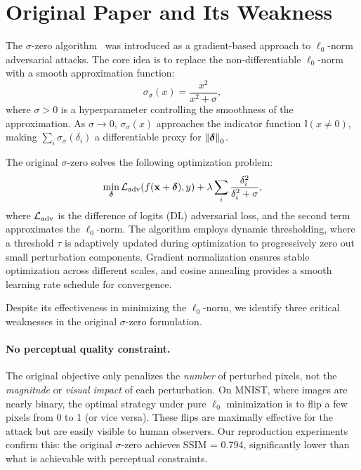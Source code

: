 \section{Original Paper and Its Weakness}
\label{sec:background}

The $\sigma$-zero algorithm~\cite{cina2025sigma} was introduced as a gradient-based approach to $\ell_0$-norm adversarial attacks. The core idea is to replace the non-differentiable $\ell_0$-norm with a smooth approximation function:
\begin{equation}
    \sigma_\sigma(x) = \frac{x^2}{x^2 + \sigma},
\end{equation}
where $\sigma > 0$ is a hyperparameter controlling the smoothness of the approximation. As $\sigma \to 0$, $\sigma_\sigma(x)$ approaches the indicator function $\mathbb{I}(x \neq 0)$, making $\sum_i \sigma_\sigma(\delta_i)$ a differentiable proxy for $\left\|\boldsymbol{\delta}\right\|_0$.

The original $\sigma$-zero solves the following optimization problem:
\begin{equation}
    \min_{\boldsymbol{\delta}} {\cal L}_{\text{adv}}(f(\mathbf{x} + \boldsymbol{\delta}), y) + \lambda \sum_{i} \frac{\delta_i^2}{\delta_i^2 + \sigma},
\end{equation}
where ${\cal L}_{\text{adv}}$ is the difference of logits (DL) adversarial loss, and the second term approximates the $\ell_0$-norm. The algorithm employs dynamic thresholding, where a threshold $\tau$ is adaptively updated during optimization to progressively zero out small perturbation components. Gradient normalization ensures stable optimization across different scales, and cosine annealing provides a smooth learning rate schedule for convergence.

Despite its effectiveness in minimizing the $\ell_0$-norm, we identify three critical weaknesses in the original $\sigma$-zero formulation.

\paragraph{No perceptual quality constraint.} The original objective only penalizes the \emph{number} of perturbed pixels, not the \emph{magnitude} or \emph{visual impact} of each perturbation. On MNIST, where images are nearly binary, the optimal strategy under pure $\ell_0$ minimization is to flip a few pixels from 0 to 1 (or vice versa). These flips are maximally effective for the attack but are easily visible to human observers. Our reproduction experiments confirm this: the original $\sigma$-zero achieves SSIM = 0.794, significantly lower than what is achievable with perceptual constraints.

